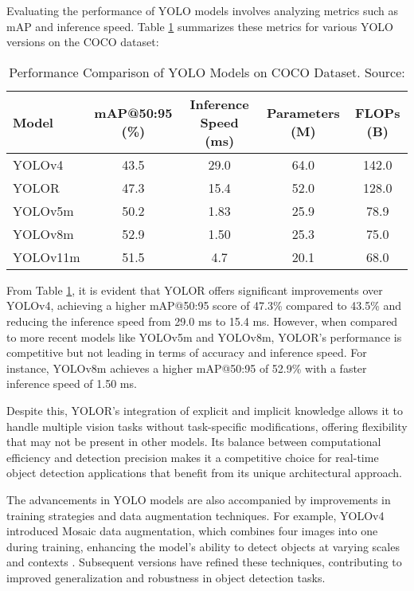 \documentclass[3p,times]{elsarticle}
\begin{document}
Evaluating the performance of YOLO models involves analyzing metrics such as mAP and inference speed. Table \ref{tab:yolo_performance_comparison} summarizes these metrics for various YOLO versions on the COCO dataset:

\begin{table}[H]
\centering
\caption{Performance Comparison of YOLO Models on COCO Dataset. Source: \cite{ultralytics_yolov5} \cite{Khanam2024YOLOv11}}
\label{tab:yolo_performance_comparison}
\begin{tabular}{|l|c|c|c|c|}
\hline
\textbf{Model} & \textbf{mAP@50:95 (\%)} & \textbf{Inference Speed (ms)} & \textbf{Parameters (M)} & \textbf{FLOPs (B)} \\ \hline
YOLOv4   & 43.5 & 29.0  & 64.0  & 142.0 \\ \hline
YOLOR    & 47.3 & 15.4  & 52.0  & 128.0 \\ \hline
YOLOv5m  & 50.2 & 1.83  & 25.9  & 78.9  \\ \hline
YOLOv8m  & 52.9 & 1.50  & 25.3  & 75.0  \\ \hline
YOLOv11m & 51.5 & 4.7  & 20.1  & 68.0  \\ \hline
\end{tabular}
\end{table}

From Table \ref{tab:yolo_performance_comparison}, it is evident that YOLOR offers significant improvements over YOLOv4, achieving a higher mAP@50:95 score of 47.3\% compared to 43.5\% and reducing the inference speed from 29.0 ms to 15.4 ms. However, when compared to more recent models like YOLOv5m and YOLOv8m, YOLOR's performance is competitive but not leading in terms of accuracy and inference speed. For instance, YOLOv8m achieves a higher mAP@50:95 of 52.9\% with a faster inference speed of 1.50 ms.

Despite this, YOLOR's integration of explicit and implicit knowledge allows it to handle multiple vision tasks without task-specific modifications, offering flexibility that may not be present in other models. Its balance between computational efficiency and detection precision makes it a competitive choice for real-time object detection applications that benefit from its unique architectural approach.

The advancements in YOLO models are also accompanied by improvements in training strategies and data augmentation techniques. For example, YOLOv4 introduced Mosaic data augmentation, which combines four images into one during training, enhancing the model's ability to detect objects at varying scales and contexts \cite{bochkovskiy2020yolov4optimalspeedaccuracy}.  Subsequent versions have refined these techniques, contributing to improved generalization and robustness in object detection tasks.
\end{document}
